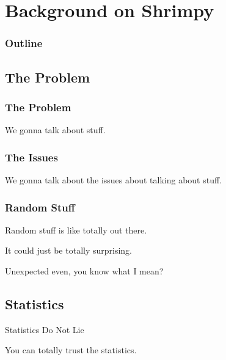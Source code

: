 \section{Background on Shrimpy}


\begin{frame}
  \frametitle{Outline}
  \tableofcontents[ currentsection ]
\end{frame}

\subsection{The Problem}

\begin{frame}
  \frametitle{The Problem}

  We gonna talk about stuff.

\end{frame}


\begin{frame}
  \frametitle{The Issues}

  We gonna talk about the issues about talking about stuff.

\end{frame}


\begin{frame}
  \frametitle{Random Stuff}

  Random stuff is like totally out there.

  {

    It could just be totally surprising.

  }

  {

    Unexpected even, you know what I mean?

  }


\end{frame}


\subsection{Statistics}

\begin{frame}{Statistics Do Not Lie}

  You can totally trust the statistics.




\end{frame}



